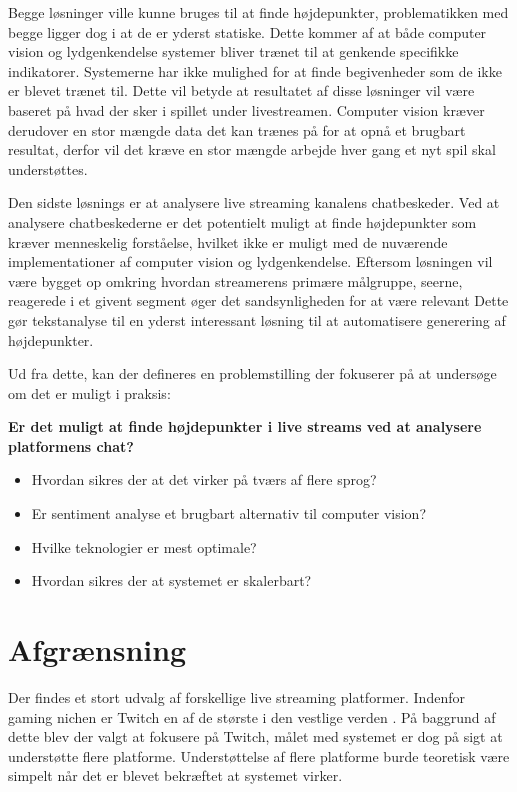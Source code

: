 \documentclass{article}
\begin{document}
Begge løsninger ville kunne bruges til at finde højdepunkter, problematikken med begge ligger dog i at de er yderst statiske. Dette kommer af at både computer vision og lydgenkendelse systemer bliver trænet til at genkende specifikke indikatorer. Systemerne har ikke mulighed for at finde begivenheder som de ikke er blevet trænet til. Dette vil betyde at resultatet af disse løsninger vil være baseret på hvad der sker i spillet under livestreamen. Computer vision kræver derudover en stor mængde data det kan trænes på for at opnå et brugbart resultat, derfor vil det kræve en stor mængde arbejde hver gang et nyt spil skal understøttes.

Den sidste løsnings er at analysere live streaming kanalens chatbeskeder. Ved at analysere chatbeskederne er det potentielt muligt at finde højdepunkter som kræver menneskelig forståelse, hvilket ikke er muligt med de nuværende implementationer af computer vision og lydgenkendelse. Eftersom løsningen vil være bygget op omkring hvordan streamerens primære målgruppe, seerne, reagerede i et givent segment øger det sandsynligheden for at være relevant Dette gør tekstanalyse til en yderst interessant løsning til at automatisere generering af højdepunkter.

Ud fra dette, kan der defineres en problemstilling der fokuserer på at undersøge om det er muligt i praksis:

\textbf{Er det muligt at finde højdepunkter i live streams ved at analysere platformens chat?}

\begin{itemize}
\item Hvordan sikres der at det virker på tværs af flere sprog?
\item Er sentiment analyse et brugbart alternativ til computer vision?
\item Hvilke teknologier er mest optimale?
\item Hvordan sikres der at systemet er skalerbart?
\end{itemize}

\section{Afgrænsning}
Der findes et stort udvalg af forskellige live streaming platformer. Indenfor gaming nichen er Twitch en af de største i den vestlige verden \cite{clement_us_2022}. På baggrund af dette blev der valgt at fokusere på Twitch, målet med systemet er dog på sigt at understøtte flere platforme. Understøttelse af flere platforme burde teoretisk være simpelt når det er blevet bekræftet at systemet virker.
\end{document}
